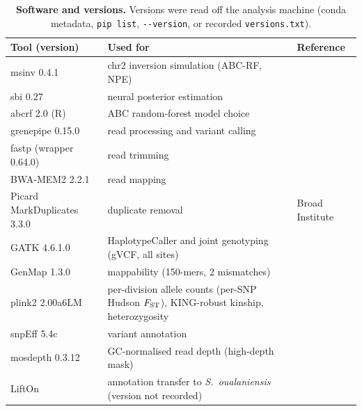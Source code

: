 \begin{table}[t]\centering
  \caption{\textbf{Software and versions.} Versions were read off the analysis machine
    (conda metadata, \texttt{pip list}, \texttt{-{}-version}, or recorded \texttt{versions.txt}).}
  \label{tab:software}
  \small
  \begin{tabularx}{\linewidth}{@{}l>{\raggedright\arraybackslash}Xl@{}}
    \toprule
    Tool (version) & Used for & Reference \\
    \midrule
    msinv 0.4.1              & chr2 inversion simulation (ABC-RF, NPE) & \citep{msinv,kelleher2018} \\
    sbi 0.27                 & neural posterior estimation                   & \citep{tejero2020,boelts2025} \\
    abcrf 2.0 (R)            & ABC random-forest model choice                & \citep{pudlo2016} \\
    grenepipe 0.15.0         & read processing and variant calling           & \citep{czech2022grenepipe} \\
    fastp (wrapper 0.64.0)   & read trimming                                 & \citep{chen2018fastp} \\
    BWA-MEM2 2.2.1           & read mapping                                  & \citep{vasimuddin2019bwamem2} \\
    Picard MarkDuplicates 3.3.0 & duplicate removal                          & Broad Institute \\
    GATK 4.6.1.0             & HaplotypeCaller and joint genotyping (gVCF, all sites) & \citep{poplin2018gatk} \\
    GenMap 1.3.0             & mappability (150-mers, 2 mismatches)          & \citep{pockrandt2020genmap} \\
    plink2 2.00a6LM          & per-division allele counts (per-SNP Hudson $F_\mathrm{ST}$), KING-robust kinship, heterozygosity & \citep{chang2015plink2,manichaikul2010} \\
    snpEff 5.4c              & variant annotation                            & \citep{cingolani2012} \\
    mosdepth 0.3.12          & GC-normalised read depth (high-depth mask)    & \citep{pedersen2018} \\
    LiftOn                   & annotation transfer to \textit{S.~oualaniensis} (version not recorded) & \citep{chao2024lifton} \\

\end{tabularx}
\end{table}
